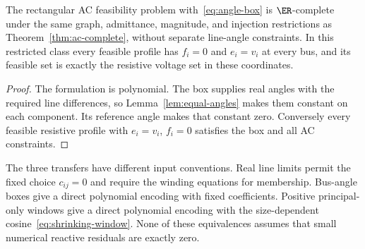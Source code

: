 \begin{corollary}
\label{cor:box-hardness}
The rectangular AC feasibility problem with~\eqref{eq:angle-box} is
$\ER$-complete under the same graph, admittance, magnitude, and injection
restrictions as Theorem~\ref{thm:ac-complete}, without separate line-angle
constraints. In this restricted class every feasible profile has $f_i=0$
and $e_i=v_i$ at every bus, and its feasible set is exactly the resistive
voltage set in these coordinates.
\end{corollary}
\begin{proof}
The formulation is polynomial. The box supplies real angles with the
required line differences, so Lemma~\ref{lem:equal-angles} makes them
constant on each component. Its reference angle makes that constant zero.
Conversely every feasible resistive profile with $e_i=v_i$, $f_i=0$
satisfies the box and all AC constraints.
\end{proof}

The three transfers have different input conventions. Real line limits
permit the fixed choice $c_{ij}=0$ and require the winding equations for
membership. Bus-angle boxes give a direct polynomial encoding with fixed
coefficients. Positive principal-only windows give a direct polynomial
encoding with the size-dependent cosine~\eqref{eq:shrinking-window}.
None of these equivalences assumes that small numerical reactive residuals
are exactly zero.
